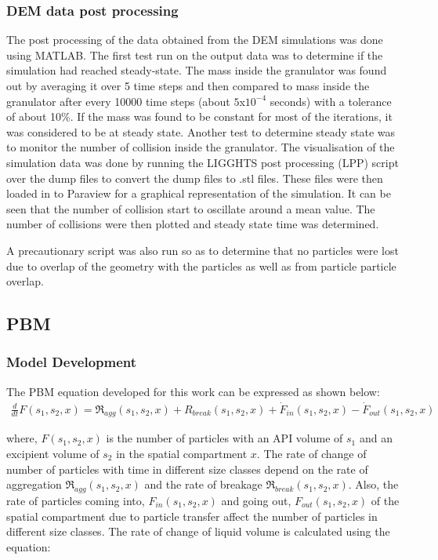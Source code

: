 \documentclass[preprint,11pt,authoryear]{elsarticle}
\begin{document}
\subsubsection{DEM data post processing}
\par The post processing of the data obtained from the DEM simulations was done using MATLAB. 
The first test run on the output data was to determine if the simulation had reached steady-state. The 
mass inside the granulator was found out by averaging it over 5 time steps and then compared to 
mass inside the granulator after every 10000 time steps (about $5$x$10^{-4}$ seconds) with a 
tolerance of about 10\%. If the mass was found to be constant for most of the iterations, it was 
considered to be at steady state. Another test to determine steady state was to monitor the number of 
collision inside the granulator. The visualisation of the simulation data was done by running the 
LIGGHTS post processing (LPP) script over the dump files to convert the dump files to .stl files. These 
files were then loaded in to Paraview\citep{henderson2004} for a graphical representation of the 
simulation. It can be seen that the number of collision start to oscillate around a mean value. The 
number of collisions were then plotted and steady state time was determined.
\par A precautionary script was also run so as to determine that no particles were lost due to overlap 
of the geometry with the particles as well as from particle particle overlap.


\subsection{PBM}
\subsubsection{Model Development}
\par The PBM equation developed for this work can be expressed as shown below:
\begin{align}
\frac{d}{dt}F(s_1,s_2,x)=\Re_{agg}(s_1,s_2,x)+R_{break}(s_1,s_2,x)+\dot{F}_{in}(s_1,s_2,x)-\dot{F}_{out}(s_1,s_2,x)
\label{eqn:mthds_pbm_overall} 
\end{align}

\par where, $F(s_1,s_2,x)$ is the number of particles with an API volume of $s_1$ and an excipient 
volume of $s_2$ in the spatial compartment $x$. The rate of change of number of particles with time 
in different size classes depend on the rate of aggregation $\Re_{agg}(s_1,s_2,x)$ and the rate of 
breakage $\Re_{break}(s_1,s_2,x)$. Also, the rate of particles coming into, $F_{in}(s_1,s_2,x)$ and 
going out, $F_{out}(s_1,s_2,x)$ of the spatial compartment due to particle transfer affect the number of 
particles in different size classes. 
The rate of change of liquid volume is calculated using the equation: 
\end{document}
